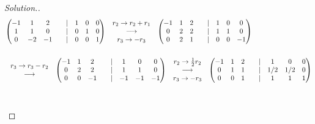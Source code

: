 \documentclass[11pt,a4paper]{article}
\theoremstyle{definition}
\newenvironment{solution}
  {\renewcommand{\qedsymbol}{}\begin{proof}[\textit{Solution}.]}
  {\end{proof}}
\begin{document}
\begin{solution}
\begin{align*}
& \begin{pmatrix}
-1&1&2&&|&1&0&0\\ 1&1&0&&|&0&1&0\\0&-2&-1&&|&0&0&1\\
\end{pmatrix}
\hspace{0.3cm}
\begin{matrix}
r_2\rightarrow r_2+r_1\\ \longrightarrow\\ r_3\rightarrow -r_3\\
\end{matrix}
\hspace{0.3cm}
\begin{pmatrix}
-1&1&2&&|&1&0&0\\0&2&2&&|&1&1&0\\0&2&1&&|&0&0&-1\\
\end{pmatrix}\\\\
&\hspace{0.3cm}
\begin{matrix}
r_3\rightarrow r_3-r_2\\ \longrightarrow\\
\end{matrix}
\hspace{0.3cm}
\begin{pmatrix}
-1&1&2&&|&1&0&0\\0&2&2&&|&1&1&0\\0&0&-1&&|&-1&-1&-1\\
\end{pmatrix}
\hspace{0.3cm}
\begin{matrix}
r_2\rightarrow \frac{1}{2}r_2\\ \longrightarrow\\ r_3\rightarrow -r_3\\
\end{matrix}
\hspace{0.3cm}
\begin{pmatrix}
-1&1&2&&|&1&0&0\\0&1&1&&|&1/2&1/2&0\\0&0&1&&|&1&1&1\\
\end{pmatrix}\\\\
&\hspace{0.3cm}

\end{align*}
\end{solution}
\end{document}
